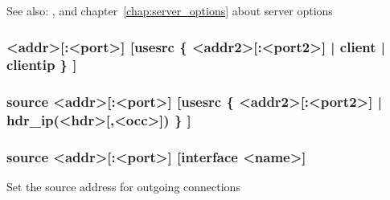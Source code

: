 See also: ,  and chapter~\ref{chap:server_options} about
             server options

\subsubsection[source]{ <addr>[:<port>] [usesrc \{ <addr2>[:<port2>] | client | clientip \} ]}
\subsubsection*{source <addr>[:<port>] [usesrc \{ <addr2>[:<port2>] | hdr\_ip(<hdr>[,<occ>]) \} ]}
\subsubsection*{source <addr>[:<port>] [interface <name>]}


  Set the source address for outgoing connections


